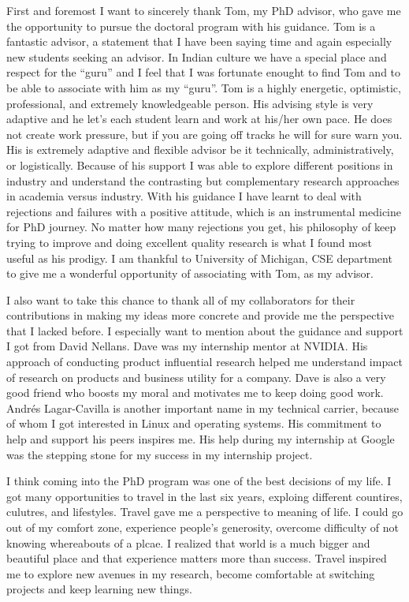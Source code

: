 First and foremost I want to sincerely thank Tom, my PhD advisor, who gave me the
opportunity to pursue the doctoral program with his guidance. Tom is a fantastic
advisor, a statement that I have been saying time and again especially new
students seeking an advisor. In Indian culture we have a special place and
respect for the ``guru'' and I feel that I was fortunate enought to find Tom and
to be able to associate with him as my ``guru''. Tom is a highly energetic,
optimistic, professional, and extremely knowledgeable person. His advising style
is very adaptive and he let's each student learn and work at his/her own pace.
He does not create work pressure, but if you are going off tracks he will for
sure warn you. His is extremely adaptive and flexible advisor be it technically,
administratively, or logistically. Because of his support I was able to explore
different positions in industry and understand the contrasting but complementary
research approaches in academia versus industry. With his guidance I have learnt
to deal with rejections and failures with a positive attitude, which is an
instrumental medicine for PhD journey. No matter how many rejections you get,
his philosophy of keep trying to improve and doing excellent quality research is
what I found most useful as his prodigy. I am thankful to University of
Michigan, CSE department to give me a wonderful opportunity of associating with
Tom, as my advisor.

I also want to take this chance to thank all of my collaborators for their
contributions in making my ideas more concrete and provide me the perspective
that I lacked before. I especially want to mention about the guidance and
support I got from David Nellans. Dave was my internship mentor at NVIDIA.  His
approach of conducting product influential research helped me understand impact
of research on products and business utility for a company.  Dave is also a very
good friend who boosts my moral and motivates me to keep doing good work.
Andr\'es Lagar-Cavilla is another important name in my technical carrier,
because of whom I got interested in Linux and operating systems. His commitment
to help and support his peers inspires me. His help during my internship at
Google was the stepping stone for my success in my internship project.

I think coming into the PhD program was one of the best decisions of my life. I
got many opportunities to travel in the last six years, exploing different
countires, culutres, and lifestyles. Travel gave me a perspective to meaning of
life. I could go out of my comfort zone, experience people's generosity,
overcome difficulty of not knowing whereabouts of a plcae. I realized that world
is a much bigger and beautiful place and that experience matters more than
success. Travel inspired me to explore new avenues in my research, become
comfortable at switching projects and keep learning new things.

